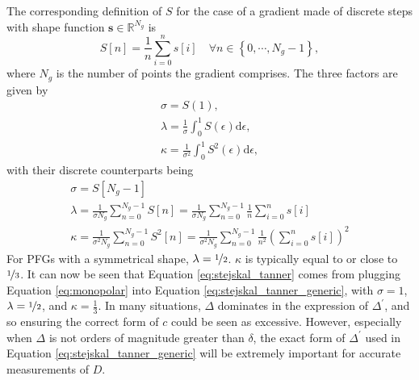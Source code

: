 The corresponding definition of $S$ for the case of a gradient made of discrete
steps with shape function $\symbf{s} \in \mathbb{R}^{N_g}$ is
\begin{equation}
    S\left[n\right] =
        \frac{1}{n} \sum_{i = 0}^{n} s\left[i\right] \quad
        \forall n \in \left\lbrace 0, \cdots, N_g - 1\right\rbrace,
\end{equation}
where $N_g$ is the number of points the gradient comprises. The three factors
are given by
\begin{subequations}
    \begin{gather}
        \sigma = S(1),\\
        \lambda = \frac{1}{\sigma} \int_0^1 S(\epsilon) \mathrm{d} \epsilon,\\
        \kappa = \frac{1}{\sigma^2} \int_0^1 S^2(\epsilon) \mathrm{d} \epsilon,
    \end{gather}
\end{subequations}
with their discrete counterparts being
\begin{subequations}
    \begin{gather}
        \sigma = S\left[N_g - 1\right] \\
        \lambda = \frac{1}{\sigma N_g} \sum_{n = 0}^{N_g - 1} S\left[n\right]
            = \frac{1}{\sigma N_g} \sum_{n = 0}^{N_g - 1}
            \frac{1}{n} \sum_{i=0}^{n} s\left[i\right]\\
        \kappa = \frac{1}{\sigma^2 N_g} \sum_{n = 0}^{N_g - 1} S^2\left[n\right]
            = \frac{1}{\sigma^2 N_g} \sum_{n = 0}^{N_g - 1}
            \frac{1}{n^2} \left(\sum_{i=0}^{n} s\left[i\right]\right)^2
    \end{gather}
\end{subequations}
For \acp{PFG} with a symmetrical shape, $\lambda = \nicefrac{1}{2}$. $\kappa$
is typically equal to or close to $\nicefrac{1}{3}$. It can now be seen that
Equation \ref{eq:stejskal_tanner} comes from plugging Equation
\ref{eq:monopolar} into Equation \ref{eq:stejskal_tanner_generic}, with $\sigma
= 1$,  $\lambda = \nicefrac{1}{2}$, and  $\kappa = \frac{1}{3}$. In many
situations,  $\Delta$ dominates in the expression of $\Delta^{\prime}$, and so
ensuring the correct form of $c$ could be seen as excessive. However,
especially when  $\Delta$ is not orders of magnitude greater than $\delta$, the
exact form of $\Delta^{\prime}$ used in Equation
\ref{eq:stejskal_tanner_generic} will be extremely important for accurate
measurements of $D$.

